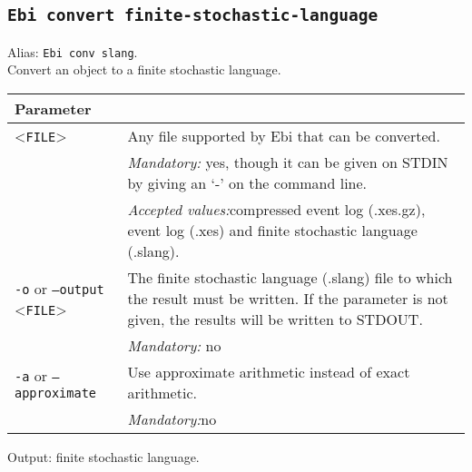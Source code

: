 {\subsection{\texttt{Ebi convert finite-stochastic-language}}
\label{command:Ebi convert finite-stochastic-language}
Alias: \texttt{Ebi conv slang}.\\
Convert an object to a finite stochastic language.\\
\begin{tabularx}{\linewidth}{lX}
\toprule
Parameter \\\midrule
<\texttt{FILE}>&Any file supported by Ebi that can be converted.\\
&\textit{Mandatory:} \quad yes, though it can be given on STDIN by giving an `-' on the command line.\\
&\textit{Accepted values:}\quad compressed event log (.xes.gz), event log (.xes) and finite stochastic language (.slang).\\
\texttt{-o} or \texttt{--output} <\texttt{FILE}> &
The finite stochastic language (.slang) file to which the result must be written. If the parameter is not given, the results will be written to STDOUT.\\
&\textit{Mandatory:} \quad no\\
\texttt{-a} or \texttt{--approximate} & Use approximate arithmetic instead of exact arithmetic.\\
&\textit{Mandatory:}\quad no\\
\bottomrule
\end{tabularx}
Output: finite stochastic language.
}

